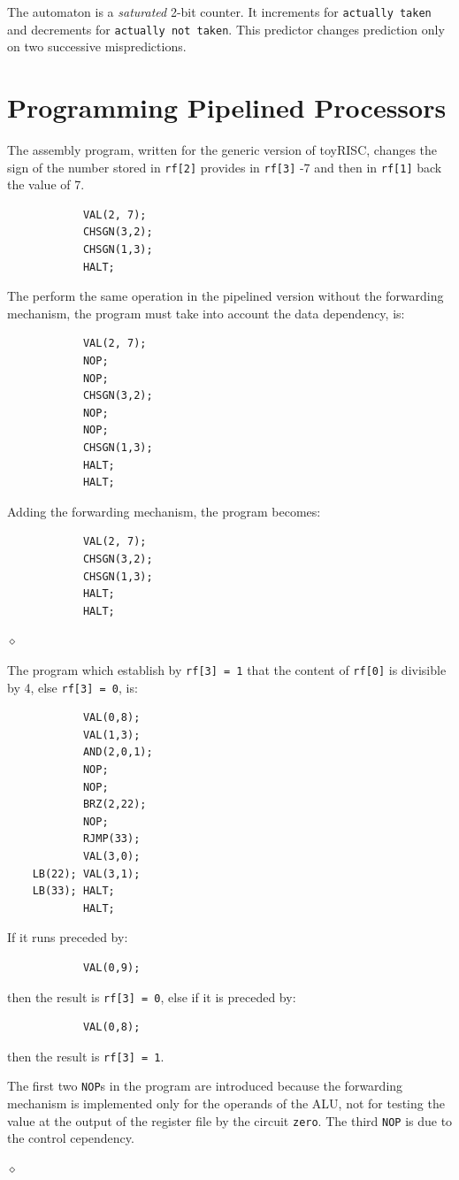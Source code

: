 The automaton is a {\em saturated} 2-bit counter. It increments for {\tt actually taken} and decrements  for {\tt actually not taken}. This predictor changes prediction only on two successive mispredictions.

\section{Programming Pipelined Processors}

\begin{exemplu}
The assembly program, written for the generic version of toyRISC, changes the sign of the number stored in {\tt rf[2]} provides in {\tt rf[3]} -7 and then in {\tt rf[1]} back the value of 7.

\begin{verbatim}
            VAL(2, 7);
            CHSGN(3,2);
            CHSGN(1,3);
            HALT;
\end{verbatim}

The perform the same operation in the pipelined version without the forwarding mechanism, the program must take into account the data dependency, is:
\begin{verbatim}
            VAL(2, 7);
            NOP;
            NOP;
            CHSGN(3,2);
            NOP;
            NOP;
            CHSGN(1,3);
            HALT;
            HALT;
\end{verbatim}

Adding the forwarding mechanism, the program becomes:
\begin{verbatim}
            VAL(2, 7);
            CHSGN(3,2);
            CHSGN(1,3);
            HALT;
            HALT;
\end{verbatim}

$\diamond$
\end{exemplu}

\begin{exemplu}
The program which establish by {\tt rf[3] = 1} that the content of {\tt rf[0]} is divisible by 4, else {\tt rf[3] = 0}, is:

\begin{verbatim}
            VAL(0,8);
            VAL(1,3);
            AND(2,0,1);
            NOP;
            NOP;
            BRZ(2,22);
            NOP;
            RJMP(33);
            VAL(3,0);
    LB(22); VAL(3,1);
    LB(33); HALT;
            HALT;
\end{verbatim}
If it runs  preceded by:
\begin{verbatim}
            VAL(0,9);
\end{verbatim}
then the result is {\tt rf[3] = 0}, else if it is preceded by:
\begin{verbatim}
            VAL(0,8);
\end{verbatim}
then the result is {\tt rf[3] = 1}.

The first two {\tt NOP}s in the program are introduced because the forwarding mechanism is implemented only for the operands of the ALU, not for testing the value at the output of the register file by the circuit {\tt zero}. The third {\tt NOP} is due to the control cependency.

$\diamond$
\end{exemplu}

